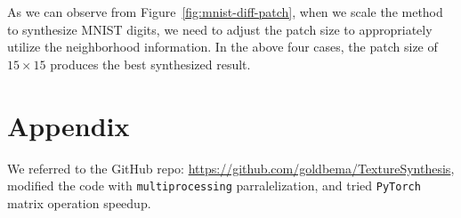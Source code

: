 \documentclass{article}
\begin{document}
As we can observe from Figure~\ref{fig:mnist-diff-patch}, when we scale the method to synthesize MNIST digits, we need to adjust the patch size to appropriately utilize the neighborhood information. In the above four cases, the patch size of $15\times 15$ produces the best synthesized result.




\printbibliography

\newpage
\section*{Appendix}
We referred to the GitHub repo: \url{https://github.com/goldbema/TextureSynthesis},
modified the code with \texttt{multiprocessing} parralelization,
and tried \texttt{PyTorch} matrix operation speedup.


\end{document}
